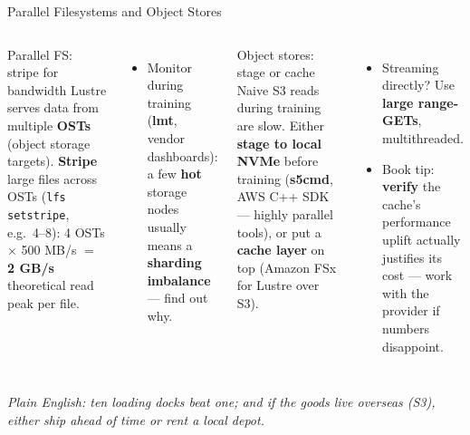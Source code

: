 \documentclass[aspectratio=169]{beamer}
\newcommand{\kw}[1]{\textbf{\textcolor{kwblue}{#1}}}
\newcommand{\pe}[1]{\par{\setlength{\fboxsep}{2.5pt}\noindent\colorbox{navy!9}{\parbox{\dimexpr\textwidth-5pt\relax}{\footnotesize\itshape Plain English: #1}}}}
\begin{document}
\begin{frame}{Parallel Filesystems and Object Stores}
  \begin{columns}[t]
    \begin{block}{Parallel FS: stripe for bandwidth}
      \small Lustre serves data from multiple \kw{OSTs} (object storage targets).
      \kw{Stripe} large files across OSTs (\texttt{lfs setstripe}, e.g.\ 4--8):
      4 OSTs $\times$ 500 MB/s $=$ \kw{2 GB/s} theoretical read peak per file.
    \end{block}
    \begin{itemize}\small
      \item Monitor during training (\kw{lmt}, vendor dashboards): a few \kw{hot} storage
            nodes usually means a \kw{sharding imbalance} --- find out why.
    \end{itemize}
    \begin{block}{Object stores: stage or cache}
      \small Naive S3 reads during training are slow. Either \kw{stage to local NVMe}
      before training (\kw{s5cmd}, AWS C++ SDK --- highly parallel tools), or put a
      \kw{cache layer} on top (Amazon FSx for Lustre over S3).
    \end{block}
    \begin{itemize}\small
      \item Streaming directly? Use \kw{large range-GETs}, multithreaded.
      \item Book tip: \kw{verify} the cache's performance uplift actually justifies its
            cost --- work with the provider if numbers disappoint.
    \end{itemize}
  \end{columns}
  \pe{ten loading docks beat one; and if the goods live overseas (S3), either ship ahead of time or rent a local depot.}
\end{frame}
\end{document}
